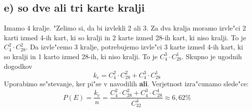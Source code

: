 \documentclass[a4paper, 12pt]{article}
\begin{document}
\subsection*{e) so dve ali tri karte kralji}
Imamo 4 kralje. "Zelimo si, da bi izvlekli 2 ali 3. Za dva kralja moramo izvle"ci 2 karti izmed 4-ih kart, ki so kralji in 2 karte izmed 28-ih kart, ki niso kralji. To je $C_4^2 \cdot C_{28}^2$. Da izvle"cemo 3 kralje, potrebujemo izvle"ci 3 karte izmed 4-ih kart, ki so kralji in 1 karto izmed 28-ih, ki niso kralji. To je $C_4^3 \cdot C_{28}^1$. Skupno je ugodnih dogodkov
\begin{equation*}
k_e = C_4^2 \cdot C_{28}^2 + C_4^3 \cdot C_{28}^1
\end{equation*}
Uporabimo se"stevanje, ker pi"se v navodilih \textbf{ali}. Verjetnost izra"cunamo slede"ce:
\begin{equation*}
P(E) = \dfrac{k_e}{n} = \dfrac{C_4^2 \cdot C_{28}^2 + C_4^3 \cdot C_{28}^1}{C_{32}^4} \approx 6,62\%
\end{equation*}
\end{document}
